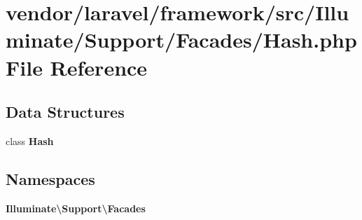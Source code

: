 \section{vendor/laravel/framework/src/\+Illuminate/\+Support/\+Facades/\+Hash.php File Reference}
\label{_hash_8php}
\subsection*{Data Structures}
\begin{DoxyCompactItemize}
\item 
class {\bf Hash}
\end{DoxyCompactItemize}
\subsection*{Namespaces}
\begin{DoxyCompactItemize}
\item 
 {\bf Illuminate\textbackslash{}\+Support\textbackslash{}\+Facades}
\end{DoxyCompactItemize}
